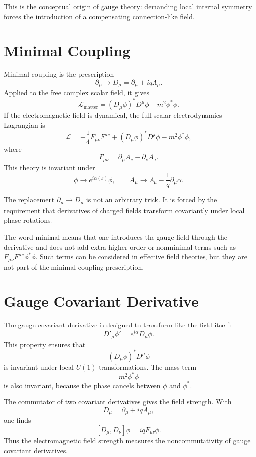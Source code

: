 This is the conceptual origin of gauge theory: demanding local internal symmetry
forces the introduction of a compensating connection-like field.

\section{Minimal Coupling}

Minimal coupling is the prescription
\[
    \partial_\mu\longrightarrow D_\mu=\partial_\mu+iqA_\mu.
\]
Applied to the free complex scalar field, it gives
\[
    \mathcal{L}_{\mathrm{matter}}
    =(D_\mu\phi)^*D^\mu\phi-m^2\phi^*\phi.
\]
If the electromagnetic field is dynamical, the full scalar electrodynamics
Lagrangian is
\[
    \mathcal{L}
    =-\frac{1}{4}F_{\mu\nu}F^{\mu\nu}
     +(D_\mu\phi)^*D^\mu\phi-m^2\phi^*\phi,
\]
where
\[
    F_{\mu\nu}=\partial_\mu A_\nu-\partial_\nu A_\mu.
\]
This theory is invariant under
\[
    \phi\longrightarrow e^{i\alpha(x)}\phi,
    \qquad
    A_\mu\longrightarrow A_\mu-\frac{1}{q}\partial_\mu\alpha.
\]

\begin{examplebox}
The replacement \(\partial_\mu\to D_\mu\) is not an arbitrary trick. It is forced
by the requirement that derivatives of charged fields transform covariantly
under local phase rotations.
\end{examplebox}

The word minimal means that one introduces the gauge field through the derivative
and does not add extra higher-order or nonminimal terms such as
\(F_{\mu\nu}F^{\mu\nu}\phi^*\phi\). Such terms can be considered in effective
field theories, but they are not part of the minimal coupling prescription.

\section{Gauge Covariant Derivative}

The gauge covariant derivative is designed to transform like the field itself:
\[
    D'_\mu\phi'=e^{i\alpha}D_\mu\phi.
\]
This property ensures that
\[
    (D_\mu\phi)^*D^\mu\phi
\]
is invariant under local \(U(1)\) transformations. The mass term
\[
    m^2\phi^*\phi
\]
is also invariant, because the phase cancels between \(\phi\) and \(\phi^*\).

The commutator of two covariant derivatives gives the field strength. With
\[
    D_\mu=\partial_\mu+iqA_\mu,
\]
one finds
\[
    [D_\mu,D_\nu]\phi=iqF_{\mu\nu}\phi.
\]
Thus the electromagnetic field strength measures the noncommutativity of gauge
covariant derivatives.

